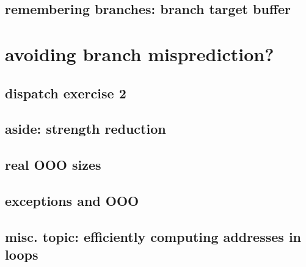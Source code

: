 \subsection{remembering branches: branch target buffer}


\section{avoiding branch misprediction?}


\subsection{dispatch exercise 2}

\subsection{aside: strength reduction}


\subsection{real OOO sizes}


\subsection{exceptions and OOO}


\subsection{misc. topic: efficiently computing addresses in loops}




